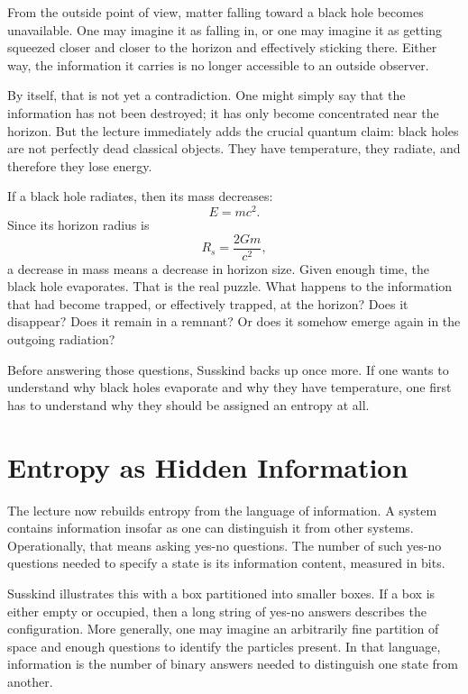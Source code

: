 From the outside point of view, matter falling toward a black hole becomes unavailable. One may imagine it as falling in, or one may imagine it as getting squeezed closer and closer to the horizon and effectively sticking there. Either way, the information it carries is no longer accessible to an outside observer.

By itself, that is not yet a contradiction. One might simply say that the information has not been destroyed; it has only become concentrated near the horizon. But the lecture immediately adds the crucial quantum claim: black holes are not perfectly dead classical objects. They have temperature, they radiate, and therefore they lose energy.

If a black hole radiates, then its mass decreases:
\begin{equation}
E=mc^2.
\end{equation}
Since its horizon radius is
\begin{equation}
R_s=\frac{2Gm}{c^2},
\end{equation}
a decrease in mass means a decrease in horizon size. Given enough time, the black hole evaporates. That is the real puzzle. What happens to the information that had become trapped, or effectively trapped, at the horizon? Does it disappear? Does it remain in a remnant? Or does it somehow emerge again in the outgoing radiation?

Before answering those questions, Susskind backs up once more. If one wants to understand why black holes evaporate and why they have temperature, one first has to understand why they should be assigned an entropy at all.

\section{Entropy as Hidden Information}

The lecture now rebuilds entropy from the language of information. A system contains information insofar as one can distinguish it from other systems. Operationally, that means asking yes-no questions. The number of such yes-no questions needed to specify a state is its information content, measured in bits.

Susskind illustrates this with a box partitioned into smaller boxes. If a box is either empty or occupied, then a long string of yes-no answers describes the configuration. More generally, one may imagine an arbitrarily fine partition of space and enough questions to identify the particles present. In that language, information is the number of binary answers needed to distinguish one state from another.

